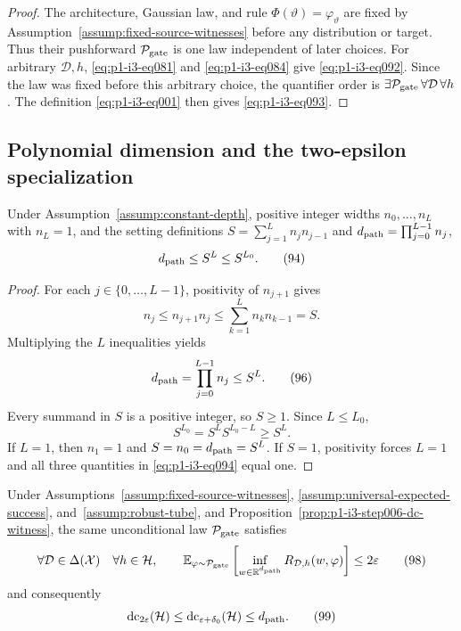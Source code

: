 \begin{proof}
The architecture, Gaussian law, and rule $\Phi(\vartheta)=\varphi_\vartheta$
are fixed by Assumption~\ref{assump:fixed-source-witnesses} before any
distribution or target.  Thus their pushforward $\mathcal P_{\rm gate}$ is
one law independent of later choices.  For arbitrary $\mathcal D,h$, \eqref{eq:p1-i3-eq081}
and \eqref{eq:p1-i3-eq084} give \eqref{eq:p1-i3-eq092}.  Since the law was fixed before this arbitrary choice, the
quantifier order is $\exists\mathcal P_{\rm gate}\,\forall\mathcal D\,\forall h$.
The definition \eqref{eq:p1-i3-eq001} then gives \eqref{eq:p1-i3-eq093}.
\end{proof}

\subsection{Polynomial dimension and the two-epsilon specialization}
\label{app:step007-specialization}

\begin{lemma}
\label{lem:p1-i3-step007-path-count}
Under Assumption~\ref{assump:constant-depth}, positive integer widths
$n_0,\ldots,n_L$ with $n_L=1$, and the setting definitions
$S=\sum_{j=1}^{L}n_jn_{j-1}$ and
$d_{\rm path}=\prod_{j=0}^{L-1}n_j$,
\[
d_{\rm path}\leq S^L\leq S^{L_0}.
\tag{94}\label{eq:p1-i3-eq094}
\]
\end{lemma}

\begin{proof}
For each $j\in\{0,\ldots,L-1\}$, positivity of $n_{j+1}$ gives
\[
n_j\leq n_{j+1}n_j\leq\sum_{k=1}^{L}n_kn_{k-1}=S.
\tag{95}\label{eq:p1-i3-eq095}
\]
Multiplying the $L$ inequalities yields
\[
d_{\rm path}=\prod_{j=0}^{L-1}n_j\leq S^L.
\tag{96}\label{eq:p1-i3-eq096}
\]
Every summand in $S$ is a positive integer, so $S\geq1$.  Since
$L\leq L_0$,
\[
S^{L_0}=S^LS^{L_0-L}\geq S^L.
\tag{97}\label{eq:p1-i3-eq097}
\]
If $L=1$, then $n_1=1$ and $S=n_0=d_{\rm path}=S^L$.  If $S=1$, positivity
forces $L=1$ and all three quantities in \eqref{eq:p1-i3-eq094} equal one.
\end{proof}

\begin{proposition}
\label{prop:p1-i3-step007-public-specialization}
Under Assumptions~\ref{assump:fixed-source-witnesses},
\ref{assump:universal-expected-success}, and~\ref{assump:robust-tube}, and
Proposition~\ref{prop:p1-i3-step006-dc-witness}, the same unconditional law
$\mathcal P_{\rm gate}$ satisfies
\[
\forall\mathcal D\in\Delta(\mathcal X)\quad
\forall h\in\mathcal H,
\qquad
\mathbb E_{\varphi\sim\mathcal P_{\rm gate}}
\left[\inf_{w\in\mathbb R^{d_{\rm path}}}
R_{\mathcal D,h}(w,\varphi)\right]\leq2\varepsilon
\tag{98}\label{eq:p1-i3-eq098}
\]
and consequently
\[
\operatorname{dc}_{2\varepsilon}(\mathcal H)
\leq\operatorname{dc}_{\varepsilon+\delta_0}(\mathcal H)
\leq d_{\rm path}.
\tag{99}\label{eq:p1-i3-eq099}
\]
\end{proposition}

